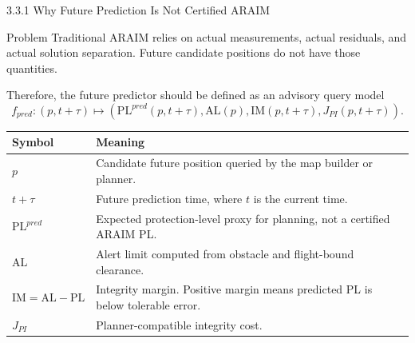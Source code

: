 \documentclass[10pt,aspectratio=169,xcolor=dvipsnames]{beamer}
\newcommand{\PL}{\mathrm{PL}}
\newcommand{\AL}{\mathrm{AL}}
\newcommand{\IM}{\mathrm{IM}}
\begin{document}
\begin{frame}{3.3.1 Why Future Prediction Is Not Certified ARAIM}
  \small
  \begin{alertblock}{Problem}
    Traditional ARAIM relies on actual measurements, actual residuals, and actual solution separation. Future candidate positions do not have those quantities.
  \end{alertblock}

  \begin{block}{Therefore, the future predictor should be defined as an advisory query model}
    \vspace{-4pt}
    \[
      f_{pred}:(p,t+\tau)\mapsto \left(\PL^{pred}(p,t+\tau),\AL(p),\IM(p,t+\tau),J_{PI}(p,t+\tau)\right).
    \]
  \end{block}

  \begin{table}\scriptsize
    \begin{tabular}{p{} p{}}
      \toprule
      \textbf{Symbol} & \textbf{Meaning}\\
      \midrule
      $p$ & Candidate future position queried by the map builder or planner.\\
      $t+\tau$ & Future prediction time, where $t$ is the current time.\\
      $\PL^{pred}$ & Expected protection-level proxy for planning, not a certified ARAIM PL.\\
      $\AL$ & Alert limit computed from obstacle and flight-bound clearance.\\
      $\IM=\AL-\PL$ & Integrity margin. Positive margin means predicted PL is below tolerable error.\\
      $J_{PI}$ & Planner-compatible integrity cost.\\
      \bottomrule
    \end{tabular}
  \end{table}
\end{frame}
\end{document}
